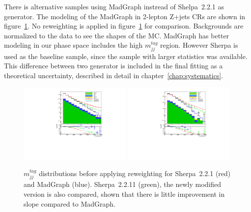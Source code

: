 There is alternative samples using MadGraph instread of Shelpa~2.2.1 as generator. 
The modeling of the MadGraph in 2-lepton Z+jets CRs are shown in figure~\ref{fig:SherpaMadGraph}. No reweighting is applied in figure~\ref{fig:SherpaMadGraph} for comparison. 
Backgrounds are normalized to the data to see the shapes of the MC. 
MadGraph has better modeling in our phase space includes the high $m^{tag}_{jj}$ region. 
However Sherpa is used as the baseline sample, since the sample with larger statistics was available.
This difference between two generator is included in the final fitting as a theoretical uncertainty, described in detail in chapter~\ref{chap:systematics}.
\begin{figure}[ht]
    \centering
    \includegraphics[width=0.49\textwidth]{figures/2lep/reweighting/MTagResJets_0ptag2pjet_0ptv_CRVjet_ratio.pdf}
    \includegraphics[width=0.49\textwidth]{figures/2lep/reweighting/MTagMerJets_0ptag1pfat0pjet_0ptv_CRVjet_ratio.pdf}
    \caption{ $m^{tag}_{jj}$ distributions before applying reweighting for Sherpa~2.2.1 (red) and MadGraph (blue). Sherpa~2.2.11 (green), the newly modified version is also compared, shown that there is little improvement in slope compared to MadGraph.}
    \label{fig:SherpaMadGraph}
\end{figure}



